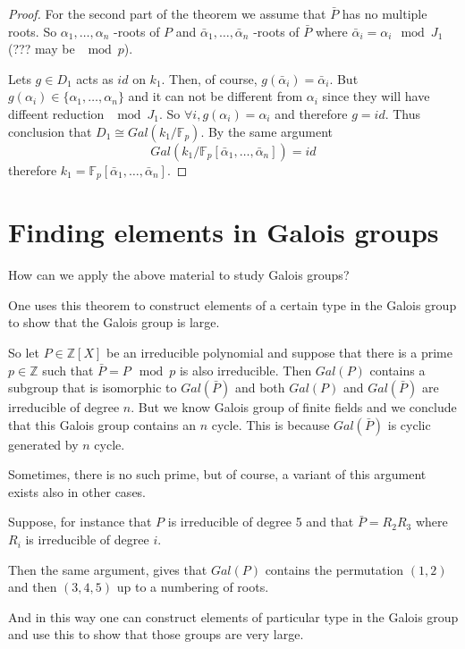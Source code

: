 \begin{theorem}
\begin{proof}
    For the second part of the theorem we assume that $\bar{P}$ has no
    multiple roots. So $\alpha_1, \dots, \alpha_n$ -roots of $P$ and
    $\bar{\alpha}_1, \dots, \bar{\alpha}_n$ -roots of $\bar{P}$ where
    $\bar{\alpha}_i = \alpha_i \mod J_1$ (??? may be $\mod p$).

    Lets $g \in D_1$ acts as $id$ on $k_1$. Then, of course,
    $g\left(\bar{\alpha}_i\right) = \bar{\alpha}_i$.
    But $g\left(\alpha_i\right) \in \{\alpha_1, \dots, \alpha_n\}$ and
    it can not be different from $\alpha_i$ since they will have
    diffeent reduction $\mod J_1$. So
    $\forall i,  g\left(\alpha_i\right) = \alpha_i$ and therefore $g =
    id$. Thus conclusion that $D_1 \cong
    Gal\left(k_1/\mathbb{F}_p\right)$. By the same argument
    \[
    Gal\left(k_1/\mathbb{F}_p\left[\bar{\alpha}_1,
      \dots, \bar{\alpha}_n\right]\right) = id
    \]
    therefore
    $k_1 = \mathbb{F}_p\left[\bar{\alpha}_1,
      \dots, \bar{\alpha}_n\right]$.
  \end{proof}
  \label{thm:lec9_2}
\end{theorem}

\section{Finding elements in Galois groups}
How can we apply the above material to study Galois groups?

One uses this theorem to construct elements of a certain type in the
Galois group to show that the Galois group is large.

So let $P \in \mathbb{Z}\left[X\right]$ be an
irreducible polynomial and suppose that there is a prime
$p \in \mathbb{Z}$ such that $\bar{P} = P \mod p$ is also irreducible.
Then $Gal\left(P\right)$ contains a subgroup that is isomorphic to 
$Gal\left(\bar{P}\right)$ and both
$Gal\left(P\right)$ and $Gal\left(\bar{P}\right)$ are
irreducible of degree $n$. But we know Galois group of finite fields
and we conclude that this Galois group contains an $n$ cycle.
This is because $Gal\left(\bar{P}\right)$ is cyclic generated by $n$ cycle.

Sometimes, there is no such prime, but of course, a variant of this
argument exists also in other cases.

Suppose, for instance that $P$ is irreducible of degree 5 and that
$\bar{P} = R_2 R_3$ where $R_i$ is irreducible of degree $i$.


Then the same argument, gives that
$Gal\left(P\right)$ contains the permutation $(1,2)$ and then
$(3,4,5)$ up to a numbering of roots.

And in this way one can construct elements of particular type in the
Galois group and use this to show that those groups are very large.  
